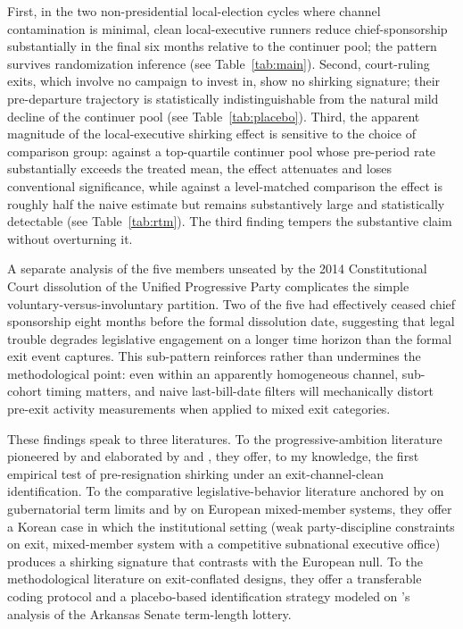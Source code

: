\documentclass[11pt]{article}
\begin{document}
First, in the two non-presidential local-election cycles where channel contamination is minimal, clean local-executive runners reduce chief-sponsorship substantially in the final six months relative to the continuer pool; the pattern survives randomization inference (see Table~\ref{tab:main}). Second, court-ruling exits, which involve no campaign to invest in, show no shirking signature; their pre-departure trajectory is statistically indistinguishable from the natural mild decline of the continuer pool (see Table~\ref{tab:placebo}). Third, the apparent magnitude of the local-executive shirking effect is sensitive to the choice of comparison group: against a top-quartile continuer pool whose pre-period rate substantially exceeds the treated mean, the effect attenuates and loses conventional significance, while against a level-matched comparison the effect is roughly half the naive estimate but remains substantively large and statistically detectable (see Table~\ref{tab:rtm}). The third finding tempers the substantive claim without overturning it.

A separate analysis of the five members unseated by the 2014 Constitutional Court dissolution of the Unified Progressive Party complicates the simple voluntary-versus-involuntary partition. Two of the five had effectively ceased chief sponsorship eight months before the formal dissolution date, suggesting that legal trouble degrades legislative engagement on a longer time horizon than the formal exit event captures. This sub-pattern reinforces rather than undermines the methodological point: even within an apparently homogeneous channel, sub-cohort timing matters, and naive last-bill-date filters will mechanically distort pre-exit activity measurements when applied to mixed exit categories.

These findings speak to three literatures. To the progressive-ambition literature pioneered by \citet{schlesinger1966} and elaborated by \citet{black1972} and \citet{rohde1979}, they offer, to my knowledge, the first empirical test of pre-resignation shirking under an exit-channel-clean identification. To the comparative legislative-behavior literature anchored by \citet{besley1995} on gubernatorial term limits and by \citet{hansen2015} on European mixed-member systems, they offer a Korean case in which the institutional setting (weak party-discipline constraints on exit, mixed-member system with a competitive subnational executive office) produces a shirking signature that contrasts with the European null. To the methodological literature on exit-conflated designs, they offer a transferable coding protocol and a placebo-based identification strategy modeled on \citet{titiunik2017}'s analysis of the Arkansas Senate term-length lottery.
\end{document}
